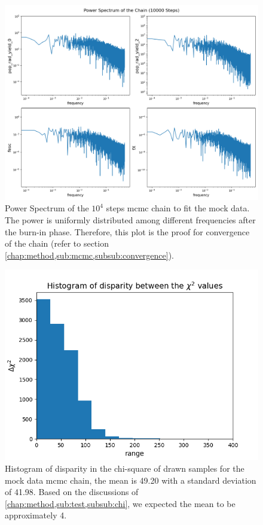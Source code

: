 \documentclass[12pt, TexShade, letterpaper]{report}
\begin{document}
\begin{figure}[h!]
\centering
\includegraphics[scale =0.5]{power_spectrum_known_curve.png}
\caption[Power spectrum of mock data \gls{mcmc} chain]{Power Spectrum of the $10^4$ steps \gls{mcmc} chain to fit the mock data. The power is uniformly distributed among different frequencies after the burn-in phase. Therefore, this plot is the proof for convergence of the chain (refer to section \ref{chap:method,sub:mcmc,subsub:convergence}).}
\label{fig:Power_spectrum_known_curve}
\end{figure}

\begin{figure}[h!]
\centering
\includegraphics[scale =0.7]{csq_hist_known_curve.png}
\caption[Histogram of disparity in the chi-square of drawn samples for the mock data \gls{mcmc} chain]{Histogram of disparity in the chi-square of drawn samples for the mock data \gls{mcmc} chain, the mean is 49.20 with a standard deviation of 41.98. Based on the discussions of \ref{chap:method,sub:test,subsub:chi}, we expected the mean to be approximately 4.}
\label{fig:csq_hist_known_curve}
\end{figure}
\end{document}
